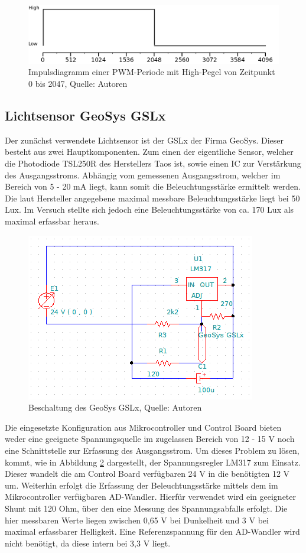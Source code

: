 \documentclass[a4paper,12pt]{scrartcl}
\begin{document}
\begin{figure}[H]
\begin{center}
\includegraphics[width=0.9\hsize]{./schematics/pwmDiagram1.png}
\end{center}
\caption{\label{fig:pwmExample1}Impulsdiagramm einer PWM-Periode mit High-Pegel von Zeitpunkt 0 bis 2047, Quelle: Autoren}
\end{figure}

\subsection{Lichtsensor GeoSys GSLx}
\label{sec:HardwareGSLx}
Der zunächst verwendete Lichtsensor ist der GSLx der Firma GeoSys. Dieser besteht aus zwei Hauptkomponenten. Zum einen der eigentliche Sensor, welcher die Photodiode TSL250R des Herstellers Taos ist, sowie einen IC zur Verstärkung des Ausgangsstroms. Abhängig vom gemessenen Ausgangsstrom, welcher im Bereich von 5 - 20 mA liegt, kann somit die Beleuchtungsstärke ermittelt werden. Die laut Hersteller angegebene maximal messbare Beleuchtungsstärke liegt bei 50 Lux. Im Versuch stellte sich jedoch eine Beleuchtungsstärke von ca. 170 Lux als maximal erfassbar heraus.

\begin{figure}[htb]
\begin{center}
\includegraphics[width=0.5\hsize]{./images/schaltung-geosys-gslx.png}
\end{center}
\caption{\label{fig:schaltplangslx}Beschaltung des GeoSys GSLx, Quelle: Autoren}
\end{figure}

Die eingesetzte Konfiguration aus Mikrocontroller und Control Board bieten weder eine geeignete Spannungsquelle im zugelassen Bereich von 12 - 15 V noch eine Schnittstelle zur Erfassung des Ausgangsstrom. Um dieses Problem zu lösen, kommt, wie in Abbildung \ref{fig:schaltplangslx} dargestellt, der Spannungsregler LM317 zum Einsatz. Dieser wandelt die am Control Board verfügbaren 24 V in die benötigten 12 V um. Weiterhin erfolgt die Erfassung der Beleuchtungsstärke mittels dem im Mikrocontroller verfügbaren AD-Wandler. Hierfür verwendet wird ein geeigneter Shunt mit 120 Ohm, über den eine Messung des Spannungsabfalls erfolgt. Die hier messbaren Werte liegen zwischen 0,65 V bei Dunkelheit und 3 V bei maximal erfassbarer Helligkeit. Eine Referenzspannung für den AD-Wandler wird nicht benötigt, da diese intern bei 3,3 V liegt.
\end{document}

